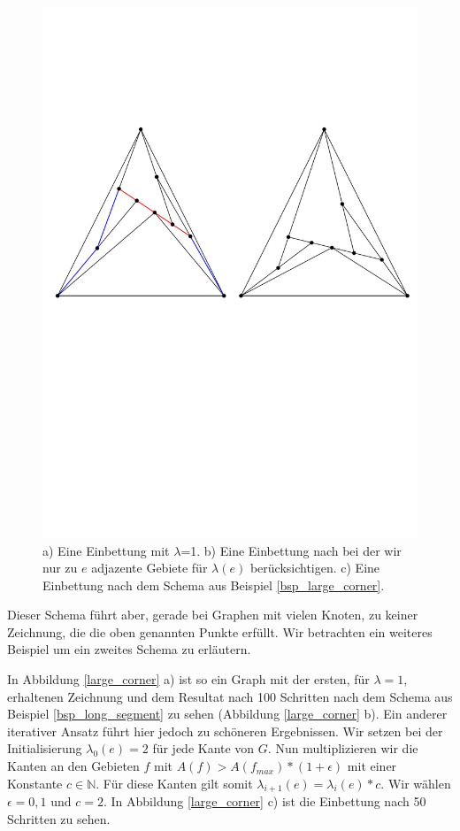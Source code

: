\begin{figure}[h]
	\centering
  \includegraphics[width=1\textwidth]{example1_vis.pdf}
  \caption{a) Eine Einbettung mit $\lambda$=1. b) Eine Einbettung nach bei der wir nur zu $e$ adjazente Gebiete für $\lambda(e)$ berücksichtigen. c) Eine Einbettung nach dem Schema aus Beispiel \ref{bsp_large_corner}.}
  \label{long_segment}
\end{figure}

Dieser Schema führt aber, gerade bei Graphen mit vielen Knoten, zu keiner Zeichnung, die die oben genannten Punkte erfüllt. Wir betrachten ein weiteres Beispiel um ein zweites Schema zu erläutern.

\begin{example}\label{bsp_large_corner} 
In Abbildung \ref{large_corner} a) ist so ein Graph mit der ersten, für $\lambda=1$, erhaltenen Zeichnung und dem Resultat nach 100 Schritten nach dem Schema aus Beispiel \ref{bsp_long_segment} zu sehen (Abbildung \ref{large_corner} b). Ein anderer iterativer Ansatz führt hier jedoch zu schöneren Ergebnissen. Wir setzen bei der Initialisierung $\lambda_0(e)=2$ für jede Kante von $G$. Nun multiplizieren wir die Kanten an den Gebieten $f$ mit $A(f) > A(f_{max})*(1+\epsilon)$ mit einer Konstante $c \in \mathbb{N}$. Für diese Kanten gilt somit $\lambda_{i+1}(e) = \lambda_{i}(e)*c$. Wir wählen $\epsilon = 0,1$ und $c=2$. In Abbildung \ref{large_corner} c) ist die Einbettung nach 50 Schritten zu sehen.
\end{example}

